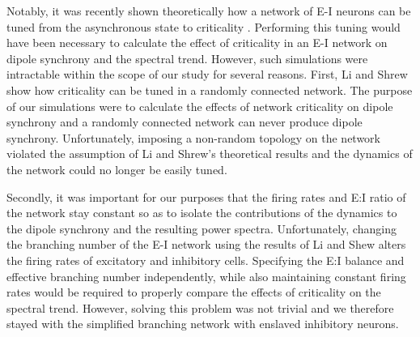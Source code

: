 Notably, it was recently shown theoretically how a network of E-I neurons can be tuned from the asynchronous state to criticality \cite{Li2020}. Performing this tuning would have been necessary to calculate the effect of criticality in an E-I network on dipole synchrony and the spectral trend. However, such simulations were intractable within the scope of our study for several reasons. First, Li and Shrew \cite{Li2020} show how criticality can be tuned in a randomly connected network. The purpose of our simulations were to calculate the effects of network criticality on dipole synchrony and a randomly connected network can never produce dipole synchrony. Unfortunately, imposing a non-random topology on the network violated the assumption of Li and Shrew's theoretical results \cite{Li2020} and the dynamics of the network could no longer be easily tuned. 

Secondly, it was important for our purposes that the firing rates and E:I ratio of the network stay constant so as to isolate the contributions of the dynamics to the dipole synchrony and the resulting power spectra. Unfortunately, changing the branching number of the E-I network using the results of Li and Shew \cite{Li2020} alters the firing rates of excitatory and inhibitory cells. Specifying the E:I balance and effective branching number independently, while also maintaining constant firing rates would be required to properly compare the effects of criticality on the spectral trend. However, solving this problem was not trivial and we therefore stayed with the simplified branching network with enslaved inhibitory neurons.

